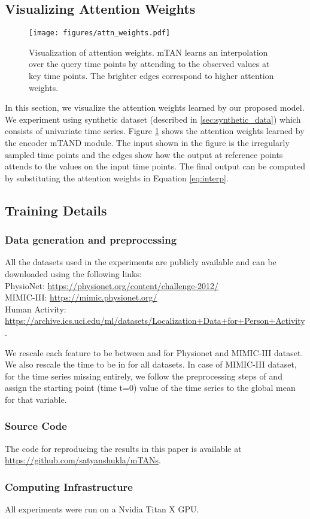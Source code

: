 \documentclass{article} \usepackage{iclr2021_conference,times}
\begin{document}
\subsection{Visualizing Attention Weights}
\begin{figure}[h]
\centering
\texttt{[image: figures/attn\_weights.pdf]}
\caption{Visualization of attention weights. mTAN learns an interpolation over the query time points by attending to the observed values at key time points. The brighter edges correspond to higher attention weights.}
\label{fig:viz}
\end{figure}

In this section, we visualize the attention weights learned by our proposed model. We  experiment using synthetic dataset (described in \ref{sec:synthetic_data}) which consists of univariate time series. Figure \ref{fig:viz} shows the attention weights learned by the encoder mTAND module. The input shown in the figure is the irregularly sampled time points and the edges show how the output at reference points attends to the values on the input time points. The final output can be computed by substituting the attention weights in Equation \ref{eq:interp}. 
 
\subsection{Training Details}
\subsubsection{Data generation and preprocessing}
All the datasets used in the experiments are publicly available and can be downloaded using the following links:\\
PhysioNet: \url{https://physionet.org/content/challenge-2012/}\\
MIMIC-III: \url{https://mimic.physionet.org/}\\
Human Activity: \url{https://archive.ics.uci.edu/ml/datasets/Localization+Data+for+Person+Activity}.

We rescale each feature to be between  and  for Physionet and MIMIC-III dataset. We also rescale the time to be in  for all datasets. 
In case of MIMIC-III dataset, for the time series missing entirely, we follow the preprocessing steps of \citet{shukla2019} and assign the starting point (time t=0) value of the time series to the global mean for that variable. 

\subsubsection{Source Code}
The code for reproducing the results in this paper is available at \url{https://github.com/satyanshukla/mTANs}. 

\subsubsection{Computing Infrastructure} 
All experiments were run on a Nvidia Titan X GPU.





 
\end{document}

